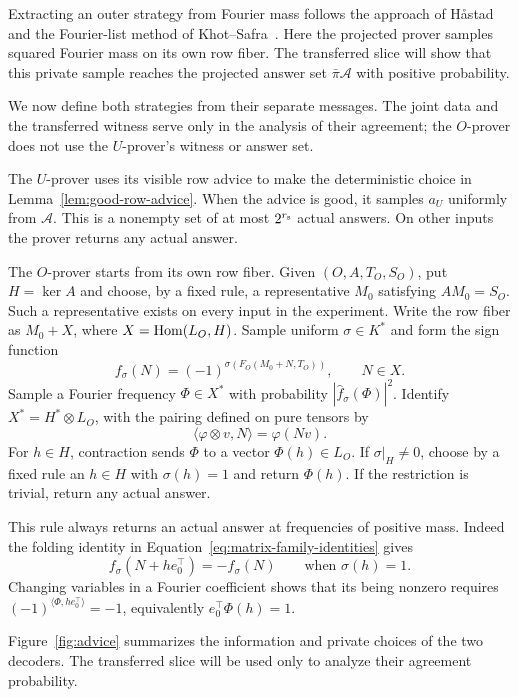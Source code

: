 Extracting an outer strategy from Fourier mass follows the approach of
H\aa stad~\cite[Section~1.1]{Hastad01} and the Fourier-list method of
Khot--Safra~\cite[Section~1.1]{KS13}. Here the projected prover samples
squared Fourier mass on its own row fiber.  The transferred slice will
show that this private sample reaches the projected answer set
$\bar\pi\mathcal A$ with positive probability.

We now define both strategies from their separate messages.  The joint
data and the transferred witness serve only in the analysis of their
agreement; the $O$-prover does not use the $U$-prover's witness or answer set.

The $U$-prover uses its visible row advice to make the deterministic choice
in Lemma~\ref{lem:good-row-advice}.  When the advice is good, it samples
$a_U$ uniformly from $\mathcal A$.
This is a nonempty set of at most $2^{r_{\rm s}}$ actual answers.  On
other inputs the prover returns any actual answer.

The $O$-prover starts from its own row fiber.  Given $(O,A,T_O,S_O)$, put
$H=\ker A$ and choose, by a fixed rule, a representative $M_0$ satisfying
$AM_0=S_O$.  Such a representative exists
on every input in the experiment.  Write the row fiber as $M_0+X$, where
$X=\operatorname{Hom}(L_O,H)$.  Sample uniform $\sigma\in K^*$ and form the sign
function
\[
 f_\sigma(N)=(-1)^{\sigma(F_O(M_0+N,T_O))},\qquad N\in X.
\]
Sample a Fourier frequency $\Phi\in X^*$ with probability
$|\widehat f_\sigma(\Phi)|^2$.  Identify
$X^*=H^*\otimes L_O$, with the pairing defined on pure tensors by
\[
 \langle\varphi\otimes v,N\rangle=\varphi(Nv).
\]
For $h\in H$, contraction sends $\Phi$ to a vector $\Phi(h)\in L_O$.
If $\sigma|_H\ne0$, choose by a fixed rule an $h\in H$ with $\sigma(h)=1$ and
return $\Phi(h)$.  If the restriction is trivial, return any actual
answer.

This rule always returns an actual answer at frequencies of positive
mass.  Indeed the folding identity in
Equation~\eqref{eq:matrix-family-identities} gives
\[
 f_\sigma(N+h e_0^\top)=-f_\sigma(N)
 \qquad\text{when }\sigma(h)=1.
\]
Changing variables in a Fourier coefficient shows that its being nonzero
requires
$(-1)^{\langle\Phi,h e_0^\top\rangle}=-1$, equivalently
$e_0^\top\Phi(h)=1$.

Figure~\ref{fig:advice} summarizes the information and private choices of
the two decoders.  The transferred slice will be used only to analyze
their agreement probability.

\FloatBarrier

